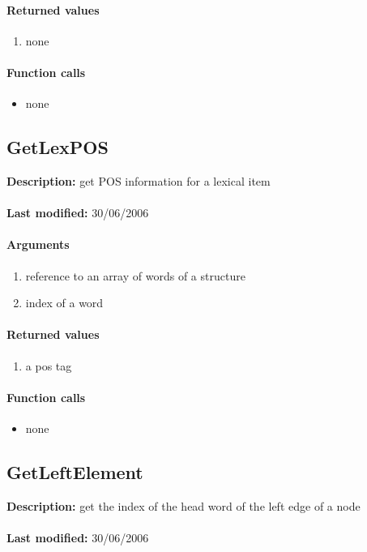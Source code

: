 \paragraph{Returned values}
\begin{enumerate}
\item none
\end{enumerate}

\paragraph{Function calls}
\begin{itemize}
\item none
\end{itemize}

\subsection{GetLexPOS}
\textbf{Description:} get POS information for a lexical item\\
\\\textbf{Last modified:} 30/06/2006

\paragraph{Arguments}
\begin{enumerate}
\item reference to an array of words of a structure
\item index of a word
\end{enumerate}

\paragraph{Returned values}
\begin{enumerate}
\item a pos tag
\end{enumerate}

\paragraph{Function calls}
\begin{itemize}
\item none
\end{itemize}

\subsection{GetLeftElement}
\textbf{Description:} get the index of the head word of the left edge of a node\\
\\\textbf{Last modified:} 30/06/2006

